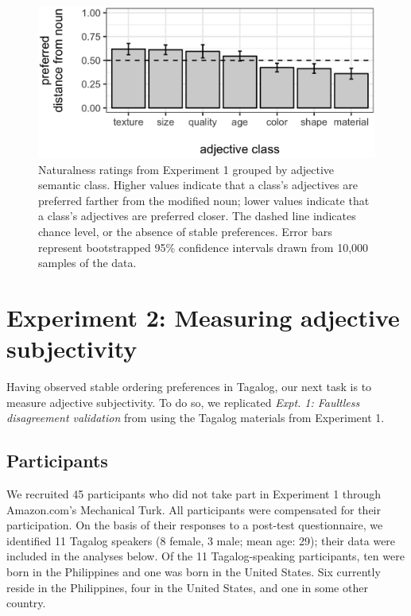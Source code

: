 \documentclass[12pt,letterpaper]{article}
\begin{document}
\begin{figure}
\centering
\includegraphics[height=2in]{LSA-class-distance.eps}
\caption{Naturalness ratings from Experiment 1 grouped by adjective semantic class. Higher values indicate that a class's adjectives are preferred farther from the modified noun; lower values indicate that a class's adjectives are preferred closer. The dashed line indicates chance level, or the absence of stable preferences. Error bars represent bootstrapped 95\% confidence intervals drawn from 10,000 samples of the data.
}
\label{exp1-results}
\end{figure}




\section{Experiment 2: Measuring adjective subjectivity} \label{expt2}

Having observed stable ordering preferences in Tagalog, our next task is to measure adjective subjectivity. To do so, we replicated \emph{Expt. 1: Faultless disagreement validation} from \cite{scontrasetal2017adjectives} using the Tagalog materials from Experiment 1.

\subsection{Participants} 

We recruited 45 participants who did not take part in Experiment 1 through Amazon.com's Mechanical Turk. All participants were compensated for their participation. On the basis of their responses to a post-test questionnaire, we identified 11 Tagalog speakers (8 female, 3 male; mean age: 29); their data were included in the analyses below. Of the 11 Tagalog-speaking participants, ten were born in the Philippines and one was born in the United States. Six currently reside in the Philippines, four in the United States, and one in some other country.
\end{document}
